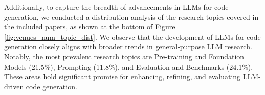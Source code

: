 Additionally, to capture the breadth of advancements in LLMs for code generation, we conducted a distribution analysis of the research topics covered in the included papers, as shown at the bottom of Figure \ref{fig:venues_num_topic_dist}. We observe that the development of LLMs for code generation closely aligns with broader trends in general-purpose LLM research. Notably, the most prevalent research topics are Pre-training and Foundation Models (21.5\%), Prompting (11.8\%), and Evaluation and Benchmarks (24.1\%). These areas hold significant promise for enhancing, refining, and evaluating LLM-driven code generation.


